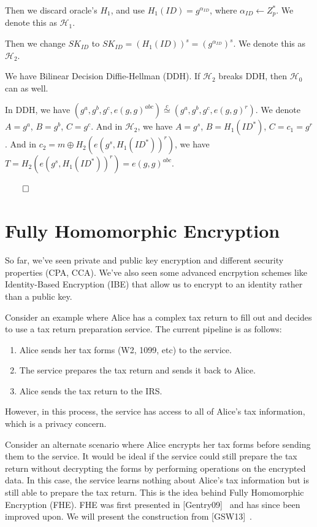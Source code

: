 \documentclass[12pt]{tufte-book}
\begin{document}
Then we discard oracle's $H_1$, and use $H_1(ID) = g^{\alpha_{ID}}$, where $\alpha_{ID} \gets Z^*_p$. We denote this as $\mathcal{H}_1$.


Then we change $SK_{ID}$ to $SK_{ID} = (H_1(ID))^s = (g^{\alpha_{ID}})^s$. We denote this as $\mathcal{H}_2$.


We have Bilinear Decision Diffie-Hellman (DDH). If $\mathcal{H}_2$ breaks DDH, then $\mathcal{H}_0$ can as well.

In DDH, we have $(g^a, g^b, g^c, e(g, g)^{abc}) \stackrel{c}{\simeq} (g^a, g^b, g^c, e(g, g)^r)$.
We denote $A = g^a$, $B = g^b$, $C = g^c$. And in $\mathcal{H}_2$, we have $A = g^s$, $B = H_1(ID^*)$, $C = c_1 = g^r$.
And in $c_2 = m \oplus H_2(e(g^s, H_1(ID^*))^r)$, we have $T = H_2(e(g^s, H_1(ID^*))^r) = e(g, g)^{abc}$.

$\qed$


 \section{Fully Homomorphic Encryption}
So far, we've seen private and public key encryption and different security properties (CPA, CCA). We've also seen some advanced encrpytion schemes like Identity-Based Encryption (IBE) that allow us to encrypt to an identity rather than a public key. 

Consider an example where Alice has a complex tax return to fill out and decides to use a tax return preparation service. The current pipeline is as follows:
\begin{enumerate}
    \item Alice sends her tax forms (W2, 1099, etc) to the service.
    \item The service prepares the tax return and sends it back to Alice.
    \item Alice sends the tax return to the IRS.
\end{enumerate}
However, in this process, the service has access to all of Alice's tax information, which is a privacy concern. 

Consider an alternate scenario where Alice encrypts her tax forms before sending them to the service. It would be ideal if the service could still prepare the tax return without decrypting the forms by performing operations on the encrypted data. In this case, the service learns nothing about Alice's tax information but is still able to prepare the tax return. This is the idea behind Fully Homomorphic Encryption (FHE). FHE was first presented in [Gentry09]~\cite{STOC:Gentry09} and has since been improved upon. We will present the construction from [GSW13]~\cite{C:GenSahWat13}.
\end{document}
